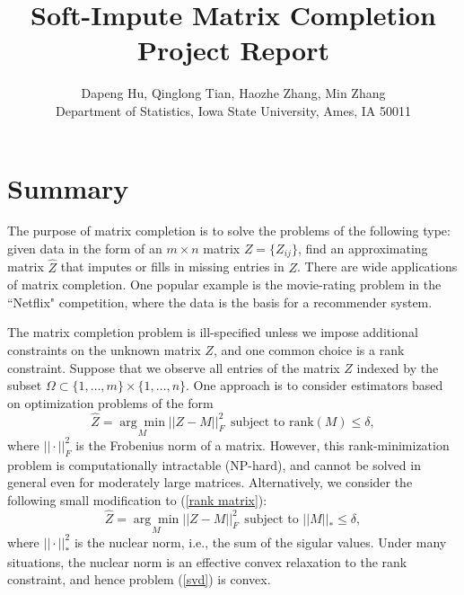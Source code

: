 \documentclass[12pt]{article}
\begin{document}
	
\author{Dapeng Hu, Qinglong Tian, Haozhe Zhang, Min Zhang\\
	Department of Statistics, Iowa State University, Ames, IA 50011\\}
\title{\bf Soft-Impute Matrix Completion Project Report}
\date{}
\maketitle

\section{Summary}
The purpose of matrix completion is to solve the problems of the following type: given data in the
form of an $m\times n$ matrix $Z = \{Z_{ij}\}$, find an approximating matrix $\widehat{Z}$ that imputes or fills in missing entries in $Z$. There are wide applications of matrix completion. One popular example is the movie-rating problem in the ``Netflix" competition, where the data is the basis for a recommender system.

The matrix completion problem is ill-specified
unless we impose additional constraints on the unknown matrix $Z$, and one
common choice is a rank constraint.  Suppose that we observe all entries of the matrix $Z$ indexed by the subset $\Omega \subset \{1, \ldots ,m\} \times \{1, \ldots, n\}$. One approach is to consider estimators based on optimization problems of the form
\begin{equation}\label{rank matrix}
\widehat{Z} = \underset{M}{\arg \min} ||Z-M||^{2}_{F} ~~\text{subject to rank}(M) \leq \delta,
\end{equation}
where $||\cdot||_{F}^{2}$ is the Frobenius norm of a matrix. However, this rank-minimization problem is computationally intractable (NP-hard), and cannot be solved in general even for moderately large matrices. Alternatively, we consider the following small modification to (\ref{rank matrix}):
\begin{equation}\label{svd}
\widehat{Z} = \underset{M}{\arg \min} ||Z-M||^{2}_{F} ~~\text{subject to }||M||_{*} \leq \delta,
\end{equation}
where $||\cdot||_{*}^{2}$ is the nuclear norm, i.e., the sum of the sigular values. Under many situations, the nuclear norm is an effective convex relaxation to the rank
constraint, and hence problem (\ref{svd}) is convex. 
\end{document}
